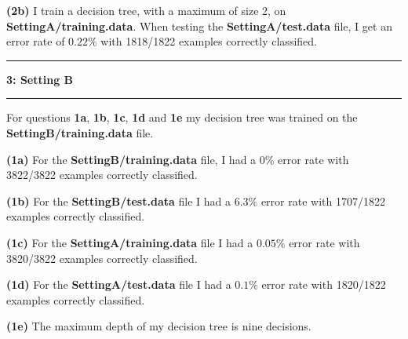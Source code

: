 \documentclass[11pt]{article}
\newcommand\question[2]{\vspace{.25in}\hrule\textbf{#1: #2}\vspace{.5em}\hrule\vspace{.10in}}
\renewcommand\part[1]{\vspace{.10in}\textbf{(#1)}}
\begin{document}
\part{2b} I train a decision tree, with a maximum of size 2, on \textbf{SettingA/training.data}. When testing the \textbf{SettingA/test.data} file, I get an error rate of $0.22\%$ with 1818/1822 examples correctly classified.


\question{3}{Setting B}

For questions \textbf{1a}, \textbf{1b}, \textbf{1c}, \textbf{1d} and \textbf{1e} my decision tree was trained on the \textbf{SettingB/training.data} file.

\part{1a} For the \textbf{SettingB/training.data} file, I had a $0\%$ error rate with 3822/3822 examples correctly classified.


\part{1b} For the \textbf{SettingB/test.data} file I had a $6.3\%$ error rate with 1707/1822 examples correctly classified.


\part{1c} For the \textbf{SettingA/training.data} file I had a $0.05\%$ error rate with 3820/3822 examples correctly classified.


\part{1d} For the \textbf{SettingA/test.data} file I had a $0.1\%$ error rate with 1820/1822 examples correctly classified.


\part{1e} The maximum depth of my decision tree is nine decisions.
\end{document}
